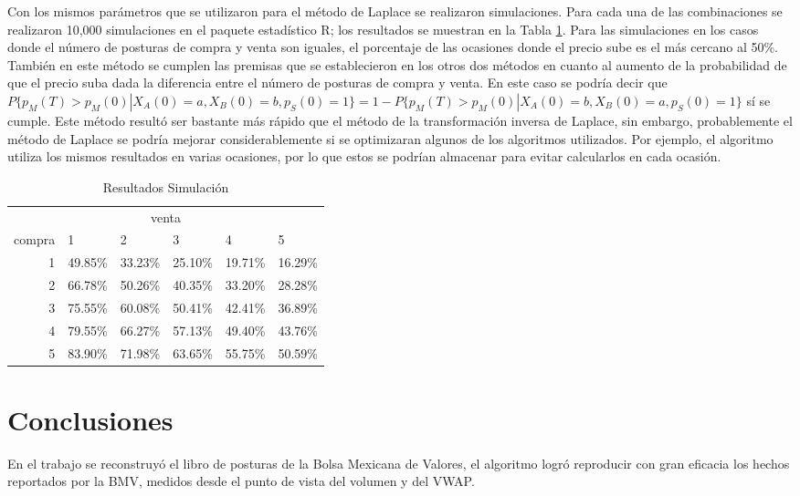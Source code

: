 \documentclass[11pt]{article}
\numberwithin{equation}{section} %
\begin{document}
Con los mismos parámetros que se utilizaron para el método de Laplace se realizaron simulaciones. Para cada una de las combinaciones se realizaron 10,000 simulaciones en el paquete estadístico R; los resultados se muestran en la Tabla \ref{tab:ressim}. Para las simulaciones en los casos donde el número de posturas de compra y venta son iguales, el porcentaje de las ocasiones donde el precio sube es el más cercano al 50\%. También en este método se cumplen las premisas que se establecieron en los otros dos métodos en cuanto al aumento de la probabilidad de que el precio suba dada la diferencia entre el número de posturas de compra y venta. En este caso se podría decir que $P\{p_M(T)>p_M(0)|X_A(0)=a,X_B(0)=b,p_S(0)=1\}=1-P\{p_M(T)>p_M(0)|X_A(0)=b,X_B(0)=a,p_S(0)=1\}$ sí se cumple. Este método resultó ser bastante más rápido que el método de la transformación inversa de Laplace, sin embargo, probablemente el método de Laplace se podría mejorar considerablemente si se optimizaran algunos de los algoritmos utilizados. Por ejemplo, el algoritmo utiliza los mismos resultados en varias ocasiones, por lo que estos se podrían almacenar para evitar calcularlos en cada ocasión.

\begin{table}[htbp]
\centering
\caption{Resultados Simulación}
\begin{tabular}{r|p{1.5cm}|p{1.5cm}|p{1.5cm}|p{1.5cm}|p{1.5cm}|}
\multicolumn{6}{c}{venta}\\
\cline{2-6}
compra & 1& 2 & 3 & 4 & 5 \\
\cline{2-6}
1 & 49.85\% & 33.23\% & 25.10\% & 19.71\% & 16.29\% \\
2 & 66.78\% & 50.26\% & 40.35\% & 33.20\% & 28.28\% \\
3 & 75.55\% & 60.08\% & 50.41\% & 42.41\% & 36.89\% \\
4 & 79.55\% & 66.27\% & 57.13\% & 49.40\% & 43.76\% \\
5 & 83.90\% & 71.98\% & 63.65\% & 55.75\% & 50.59\% \\
\cline{2-6}
\end{tabular}%
\label{tab:ressim}%
\end{table}%

\clearpage

\section{Conclusiones}

En el trabajo se reconstruyó el libro de posturas de la Bolsa Mexicana de Valores, el algoritmo logró reproducir con gran eficacia los hechos reportados por la BMV, medidos desde el punto de vista del volumen y del VWAP.\\
\end{document}
